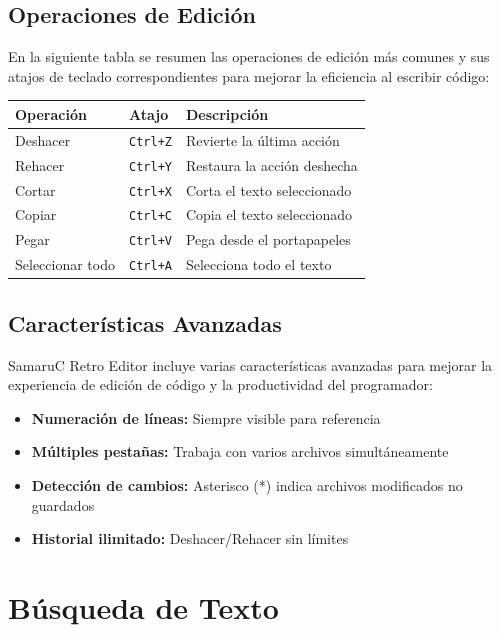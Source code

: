 \documentclass[../../main.tex]{subfiles}
\begin{document}
\clearpage 

\subsection{Operaciones de Edición}

En la siguiente tabla se resumen las operaciones de edición más comunes y sus atajos de teclado correspondientes para mejorar la eficiencia al escribir código:

\begin{tabular}{|l|l|l|}
    \hline
    \textbf{Operación} & \textbf{Atajo} & \textbf{Descripción} \\
    \hline
    Deshacer & \texttt{Ctrl+Z} & Revierte la última acción \\
    \hline
    Rehacer & \texttt{Ctrl+Y} & Restaura la acción deshecha \\
    \hline
    Cortar & \texttt{Ctrl+X} & Corta el texto seleccionado \\
    \hline
    Copiar & \texttt{Ctrl+C} & Copia el texto seleccionado \\
    \hline
    Pegar & \texttt{Ctrl+V} & Pega desde el portapapeles \\
    \hline
    Seleccionar todo & \texttt{Ctrl+A} & Selecciona todo el texto \\
    \hline
\end{tabular}

\subsection{Características Avanzadas}

SamaruC Retro Editor incluye varias características avanzadas para mejorar la experiencia de edición de código y la productividad del programador:
\begin{itemize}
     \item \textbf{Numeración de líneas:} Siempre visible para referencia
     \item \textbf{Múltiples pestañas:} Trabaja con varios archivos simultáneamente
     \item \textbf{Detección de cambios:} Asterisco (*) indica archivos modificados no guardados
     \item \textbf{Historial ilimitado:} Deshacer/Rehacer sin límites
\end{itemize}

\clearpage

\section{Búsqueda de Texto}
\end{document}
